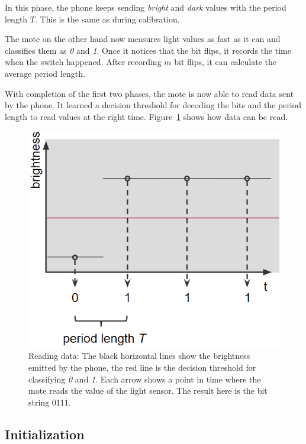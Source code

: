 \documentclass{sig-alternate} %
\begin{document}
In this phase, the phone keeps sending \textit{bright} and \textit{dark} values with the period length $T$.
This is the same as during calibration.

The mote on the other hand now measures light values as fast as it can and classifies them as \textit{0} and \textit{1}.
Once it notices that the bit flips, it records the time when the switch happened.
After recording $m$ bit flips, it can calculate the average period length.

With completion of the first two phases, the mote is now able to read data sent by the phone.
It learned a decision threshold for decoding the bits and the period length to read values at the right time.
Figure~\ref{fig:read_a_bit} shows how data can be read.

\begin{figure}
	\centering
	\includegraphics[scale=.5]{images/reading_data.png}
	\caption{Reading data: The black horizontal lines show the brightness emitted by the phone, the red line is the decision threshold for classifying \textit{0} and \textit{1}. Each arrow shows a point in time where the mote reads the value of the light sensor. The result here is the bit string 0111.}
	\label{fig:read_a_bit}
\end{figure}

\subsection{Initialization}
\label{sub:initialization}
\end{document}
